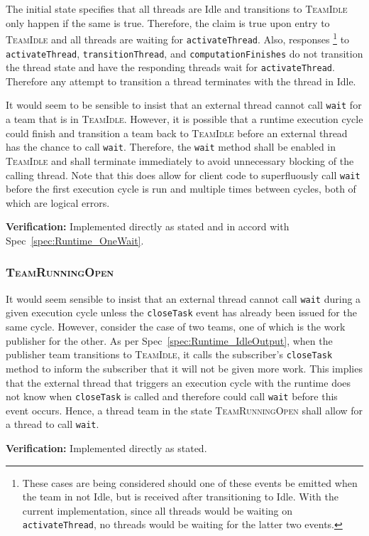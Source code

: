 \documentclass{article}
\newcommand{\TeamIdle}          {\textsc{TeamIdle}}
\newcommand{\TeamRunningOpen}   {\textsc{TeamRunningOpen}}
\begin{document}
The initial state specifies that all threads are Idle and transitions to
{\TeamIdle} only happen if the same is true.  Therefore, the claim is true upon
entry to {\TeamIdle} and all threads are waiting for \texttt{activateThread}.
Also, responses
\footnote{These cases are being considered should one of these
events be emitted when the team in not Idle, but is received after transitioning
to Idle.  With the current implementation, since all threads would be waiting on
\texttt{activateThread}, no threads would be waiting for the latter two events.}
to \texttt{activateThread}, \texttt{transitionThread}, and
\texttt{computationFinishes} do not transition the thread state and have the
responding threads wait for \texttt{activateThread}.  Therefore any attempt to
transition a thread terminates with the thread in Idle.

\begin{spec}
It would seem to be sensible to insist that an external thread cannot call
\texttt{wait} for a team that is in \TeamIdle.  However, it is possible that a
runtime execution cycle could finish and transition a team back to {\TeamIdle}
before an external thread has the chance to call \texttt{wait}.  Therefore, the
\texttt{wait} method shall be enabled in {\TeamIdle} and shall terminate immediately to avoid
unnecessary blocking of the calling thread.  Note that this does allow for
client code to superfluously call \texttt{wait} before the first execution cycle
is run and multiple times between cycles, both of which are logical errors.
\end{spec}
\textbf{Verification:}\hspace{0.125in}  Implemented directly as stated and in
accord with Spec~\ref{spec:Runtime_OneWait}.  

\subsubsection{\TeamRunningOpen}
\begin{spec}
It  would seem sensible to insist that an external thread cannot call
\texttt{wait} during a given execution cycle unless the \texttt{closeTask} event
has already been issued for the same cycle.  However, consider the case of two
teams, one of which is the work publisher for the other.  As per
Spec~\ref{spec:Runtime_IdleOutput}, when the publisher team transitions to
{\TeamIdle}, it calls the subscriber's \texttt{closeTask} method to inform the
subscriber that it will not be given more work.  This implies that the external
thread that triggers an execution cycle with the runtime does not know when
\texttt{closeTask} is called and therefore could call \texttt{wait} before this
event occurs.  Hence, a thread team in the state {\TeamRunningOpen} shall allow
for a thread to call \texttt{wait}.
\end{spec}
\textbf{Verification:}\hspace{0.125in}  Implemented directly as stated.
\end{document}

